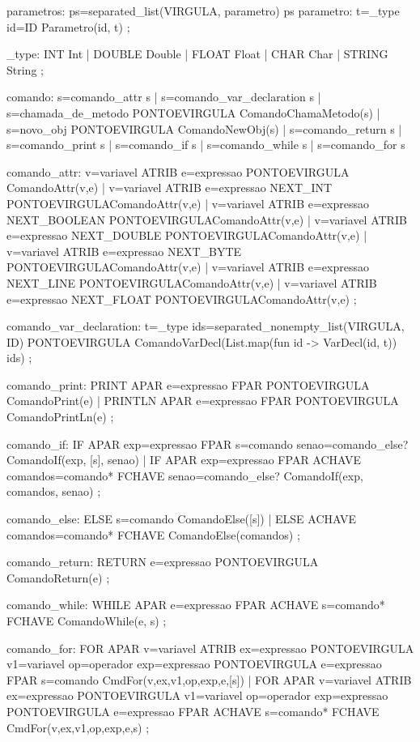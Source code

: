 \documentclass[12pt,a4paper,twoside]{report}
\begin{document}
\begin{terminal}
parametros:
    ps=separated_list(VIRGULA, parametro) { ps }
parametro:
    t=_type id=ID { Parametro(id, t)}
    ;

_type:
    INT { Int }
    | DOUBLE { Double }
    | FLOAT { Float }
    | CHAR { Char }
    | STRING { String }
    ;


comando:
      s=comando_attr { s }
    | s=comando_var_declaration { s }
    | s=chamada_de_metodo PONTOEVIRGULA { ComandoChamaMetodo(s) }
    | s=novo_obj PONTOEVIRGULA { ComandoNewObj(s) }
    | s=comando_return { s }
    | s=comando_print { s }
    | s=comando_if { s }
    | s=comando_while { s }
    | s=comando_for{ s }


comando_attr:
    v=variavel ATRIB e=expressao PONTOEVIRGULA { ComandoAttr(v,e) }
    | v=variavel ATRIB e=expressao NEXT_INT PONTOEVIRGULA{ComandoAttr(v,e)}
    | v=variavel ATRIB e=expressao NEXT_BOOLEAN PONTOEVIRGULA{ComandoAttr(v,e)}
    | v=variavel ATRIB e=expressao NEXT_DOUBLE PONTOEVIRGULA{ComandoAttr(v,e)}
    | v=variavel ATRIB e=expressao NEXT_BYTE PONTOEVIRGULA{ComandoAttr(v,e)}
    | v=variavel ATRIB e=expressao NEXT_LINE PONTOEVIRGULA{ComandoAttr(v,e)}
    | v=variavel ATRIB e=expressao NEXT_FLOAT PONTOEVIRGULA{ComandoAttr(v,e)}
    ;

comando_var_declaration:
    t=_type ids=separated_nonempty_list(VIRGULA, ID) PONTOEVIRGULA { ComandoVarDecl(List.map(fun id -> VarDecl(id, t)) ids) }
    ;

comando_print:
      PRINT APAR e=expressao FPAR PONTOEVIRGULA { ComandoPrint(e) }
    | PRINTLN APAR e=expressao FPAR PONTOEVIRGULA { ComandoPrintLn(e) }
    ;

comando_if:
      IF APAR exp=expressao FPAR s=comando senao=comando_else? { ComandoIf(exp, [s], senao) }
    | IF APAR exp=expressao FPAR  ACHAVE comandos=comando* FCHAVE senao=comando_else? { ComandoIf(exp, comandos, senao) }
    ;

comando_else:
      ELSE s=comando { ComandoElse([s]) }
    | ELSE ACHAVE comandos=comando* FCHAVE { ComandoElse(comandos) }
    ;

comando_return:
    RETURN e=expressao PONTOEVIRGULA { ComandoReturn(e) }
    ;

comando_while:
    WHILE APAR e=expressao FPAR ACHAVE s=comando* FCHAVE { ComandoWhile(e, s) }
    ;


comando_for: 
    FOR APAR v=variavel ATRIB ex=expressao PONTOEVIRGULA v1=variavel op=operador exp=expressao PONTOEVIRGULA e=expressao FPAR s=comando { CmdFor(v,ex,v1,op,exp,e,[s]) }
    | FOR APAR v=variavel ATRIB ex=expressao PONTOEVIRGULA v1=variavel op=operador exp=expressao PONTOEVIRGULA e=expressao FPAR ACHAVE s=comando* FCHAVE { CmdFor(v,ex,v1,op,exp,e,s) }	
    ;


\end{terminal}
\end{document}

